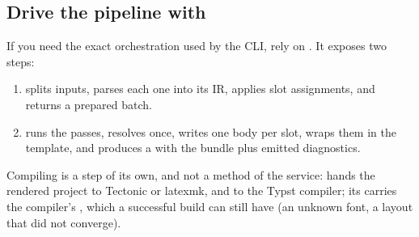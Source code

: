 \documentclass[a4paper,twoside]{article}
\begin{document}
\subsection{Drive the pipeline with }
If you need the exact orchestration used by the CLI, rely on . It exposes two steps:
\begin{enumerate}
\item {} splits inputs, parses each one into its IR, applies slot assignments, and returns a prepared batch.
\item {} runs the passes, resolves once, writes one body per slot, wraps them in the template, and produces a  with the bundle plus emitted diagnostics.
\end{enumerate}
Compiling is a step of its own, and not a method of the service:  hands the rendered project to Tectonic or latexmk, and  to the Typst compiler; its  carries the compiler's , which a successful build can still have (an unknown font, a layout that did not converge).
\end{document}
